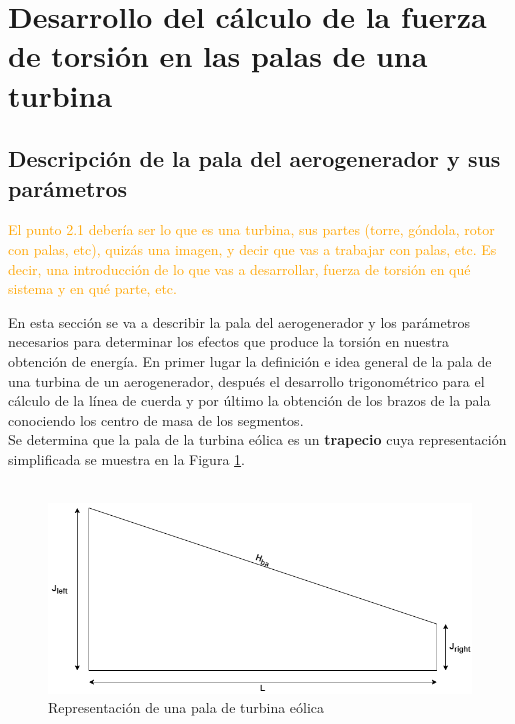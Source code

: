 \section{ Desarrollo del cálculo de la fuerza de torsión en las palas de una turbina}

\subsection{Descripción de la pala del aerogenerador y sus parámetros}

\textcolor{orange}{\huge El punto 2.1 debería ser lo que es una turbina, sus partes (torre, góndola, rotor con palas, etc), quizás una imagen, y decir que vas a trabajar con palas, etc. Es decir, una introducción de lo que vas a desarrollar, fuerza de torsión en qué sistema y en qué parte, etc.}

En esta sección se va a describir la pala del aerogenerador y los parámetros necesarios para determinar los efectos que produce la torsión en nuestra obtención de energía. En primer lugar la definición e idea general de la pala de una turbina de un aerogenerador, después el desarrollo trigonométrico para el cálculo de la línea de cuerda y por último la obtención de los brazos de la pala conociendo los centro de masa de los segmentos.\\


Se determina que la pala de la turbina eólica es un \textbf{trapecio} cuya representación simplificada se muestra en la Figura \ref{fig:pala_simp}. \\\\

\begin{figure}[H]
    \centering
    \includegraphics[width=1\textwidth]{images/pala simple.drawio.png}
    \caption{Representación de una pala de turbina eólica}
    \label{fig:pala_simp}
\end{figure}


